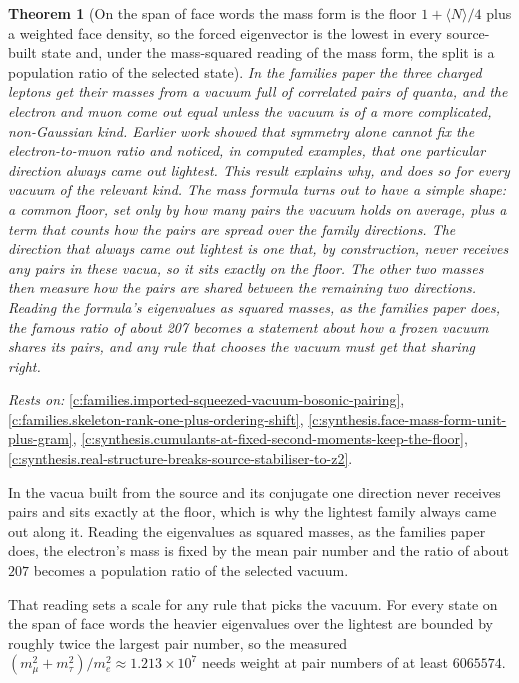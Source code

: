 \documentclass[11pt]{article}
\newtheorem{theorem}{Theorem}[section]
\theoremstyle{definition}
\theoremstyle{plain}
\begin{document}
\begin{theorem}[On the span of face words the mass form is the floor $1 + \langle N\rangle/4$ plus a weighted face density, so the forced eigenvector is the lowest in every source-built state and, under the mass-squared reading of the mass form, the split is a population ratio of the selected state]\label{c:synthesis.pair-singlet-mass-form-is-floor-plus-face-density}
In the families paper the three charged leptons get their masses from a vacuum full of correlated pairs of quanta, and the electron and muon come out equal unless the vacuum is of a more complicated, non-Gaussian kind. Earlier work showed that symmetry alone cannot fix the electron-to-muon ratio and noticed, in computed examples, that one particular direction always came out lightest. This result explains why, and does so for every vacuum of the relevant kind. The mass formula turns out to have a simple shape: a common floor, set only by how many pairs the vacuum holds on average, plus a term that counts how the pairs are spread over the family directions. The direction that always came out lightest is one that, by construction, never receives any pairs in these vacua, so it sits exactly on the floor. The other two masses then measure how the pairs are shared between the remaining two directions. Reading the formula's eigenvalues as squared masses, as the families paper does, the famous ratio of about 207 becomes a statement about how a frozen vacuum shares its pairs, and any rule that chooses the vacuum must get that sharing right.
\end{theorem}
\noindent\emph{Rests on:} \ref{c:families.imported-squeezed-vacuum-bosonic-pairing}, \ref{c:families.skeleton-rank-one-plus-ordering-shift}, \ref{c:synthesis.face-mass-form-unit-plus-gram}, \ref{c:synthesis.cumulants-at-fixed-second-moments-keep-the-floor}, \ref{c:synthesis.real-structure-breaks-source-stabiliser-to-z2}.

In the vacua built from the source and its conjugate one direction never receives pairs and sits exactly at the floor, which is why the lightest family always came out along it. Reading the eigenvalues as squared masses, as the families paper does, the electron's mass is fixed by the mean pair number and the ratio of about $207$ becomes a population ratio of the selected vacuum.

That reading sets a scale for any rule that picks the vacuum. For every state on the span of face words the heavier eigenvalues over the lightest are bounded by roughly twice the largest pair number, so the measured $(m_{\mu}^{2} + m_{\tau}^{2})/m_{e}^{2} \approx 1.213 \times 10^{7}$ needs weight at pair numbers of at least $6065574$.
\end{document}
